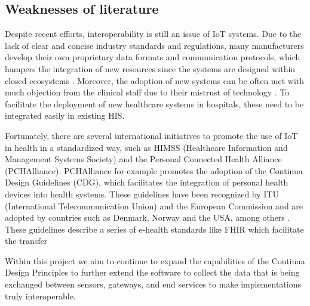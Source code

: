 \clearpage
\subsection{Weaknesses of literature}
\label{sec:weaknesses}


Despite recent efforts, interoperability is still an issue of \acs{IoT} systems. Due to the lack of clear and concise industry standards and regulations, many manufacturers develop their own proprietary data formats and communication protocols, which hampers the integration of new resources since the systems are designed within closed ecosystems \cite{Rubi2019}. Moreover, the adoption of new systems can be often met with much objection from the clinical staff due to their mistrust of technology \cite{DursunErgezen2020}. 
To facilitate the deployment of new healthcare systems in hospitals, these need to be integrated easily in existing \acs{HIS}. \bigskip

Fortunately, there are several international initiatives to promote the use of \acs{IoT} in health in a standardized way, such as HIMSS (Healthcare Information and Management Systems Society) and the Personal Connected Health Alliance (PCHAlliance). PCHAlliance for example promotes the adoption of the Continua Design Guidelines (CDG), which facilitates the integration of personal health devices into health systems. These guidelines have been recognized by ITU (International Telecommunication Union) and the European Commission and are adopted by countries such as Denmark, Norway and the USA, among others \cite{PersonalConnectedHealthAlliance2017}. These guidelines describe a series of e-health standards like \acs{FHIR} which facilitate the transfer  

Within this project we aim to continue to expand the capabilities of the Continua Design Principles to
further extend the software to collect the data that is being exchanged between sensors, gateways,
and end services to make implementations truly interoperable.

